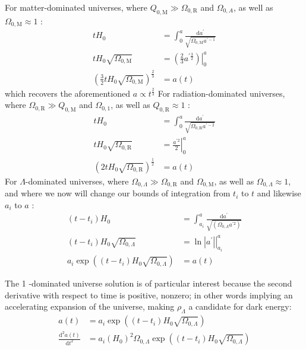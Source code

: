 \documentclass[10pt]{article}
\begin{document}
For matter-dominated universes, where $Q_{0, \mathrm{M}} \gg \Omega_{0, \mathrm{R}}$ and $\Omega_{0, A}$, as well as $\Omega_{0, \mathrm{M}} \approx 1$ :
$$
\begin{aligned}
t H_0 & =\int_0^a \frac{\mathrm{d} a^{\prime}}{\sqrt{\Omega_{0, \mathrm{M}} a^{\prime-1}}} \\
t H_0 \sqrt{\Omega_{0, \mathrm{M}}} & =\left.\left(\frac{2}{3} a^{\prime \frac{3}{2}}\right)\right|_0 ^a \\
\left(\frac{3}{2} t H_0 \sqrt{\Omega_{0, \mathrm{M}}}\right)^{\frac{2}{3}} & =a(t)
\end{aligned}
$$
which recovers the aforementioned $a \propto t^{\frac{2}{3}}$
For radiation-dominated universes, where $\Omega_{0, \mathrm{R}} \gg Q_{0, \mathrm{M}}$ and $\Omega_{0,1}$, as well as $Q_{0, \mathrm{R}} \approx 1$ :
$$
\begin{aligned}
t H_0 & =\int_0^a \frac{\mathrm{d} a^{\prime}}{\sqrt{\Omega_{0, \mathrm{R}} a^{\prime-2}}} \\
t H_0 \sqrt{\Omega_{0, \mathrm{R}}} & =\left.\frac{a^{\prime 2}}{2}\right|_0 ^a \\
\left(2 t H_0 \sqrt{\Omega_{0, \mathrm{R}}}\right)^{\frac{1}{2}} & =a(t)
\end{aligned}
$$
For $\Lambda$-dominated universes, where $\Omega_{0, \Lambda} \gg \Omega_{0, \mathrm{R}}$ and $\Omega_{0, \mathrm{M}}$, as well as $\Omega_{0, \Lambda} \approx 1$, and where we now will change our bounds of integration from $t_i$ to $t$ and likewise $a_i$ to $a$ :
$$
\begin{aligned}
\left(t-t_i\right) H_0 & =\int_{a_i}^a \frac{\mathrm{d} a^{\prime}}{\sqrt{\left(\Omega_{0, \Lambda} a^{\prime 2}\right)}} \\
\left(t-t_i\right) H_0 \sqrt{\Omega_{0, \Lambda}} & =\left.\ln \left|a^{\prime}\right|\right|_{a_i} ^a \\
a_i \exp \left(\left(t-t_i\right) H_0 \sqrt{\Omega_{0, \Lambda}}\right) & =a(t)
\end{aligned}
$$

The 1 -dominated universe solution is of particular interest because the second derivative with respect to time is positive, nonzero; in other words implying an accelerating expansion of the universe, making $\rho_{\Lambda}$ a candidate for dark energy:
$$
\begin{aligned}
a(t) & =a_i \exp \left(\left(t-t_i\right) H_0 \sqrt{\Omega_{0, \Lambda}}\right) \\
\frac{\mathrm{d}^2 a(t)}{\mathrm{d} t^2} & =a_i\left(H_0\right)^2 \Omega_{0, \Lambda} \exp \left(\left(t-t_i\right) H_0 \sqrt{\Omega_{0, \Lambda}}\right)
\end{aligned}
$$
\end{document}
